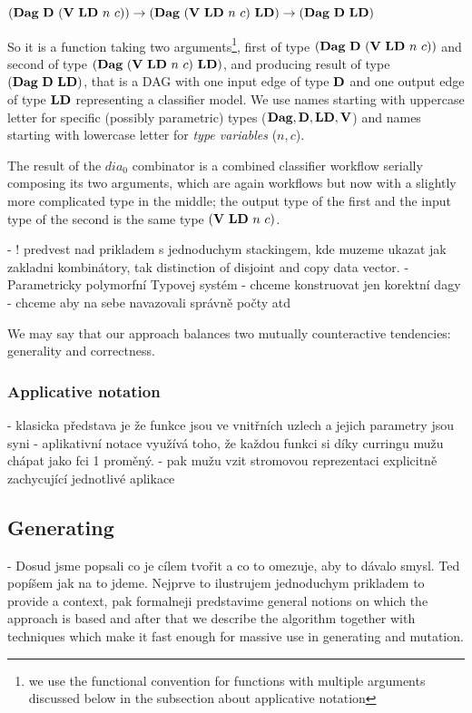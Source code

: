 \documentclass[a4paper,oneside]{memoir}
\begin{document}
$(\textbf{Dag}\ \textbf{D}\ (\textbf{V}\ \textbf{LD}\ n\ c)) \rightarrow (\textbf{Dag}\ (\textbf{V}\ \textbf{LD}\ n\ c)\ \textbf{LD}) \rightarrow (\textbf{Dag}\ \textbf{D}\ \textbf{LD})$
  
So it is a function taking two arguments\footnote{we use the functional convention for functions with multiple arguments discussed below in the subsection about applicative notation}, 
first of type $(\textbf{Dag}\ \textbf{D}\ (\textbf{V}\ \textbf{LD}\ n\ c))$ and second of type $(\textbf{Dag}\ (\textbf{V}\ \textbf{LD}\ n\ c)\ \textbf{LD})$, 
and producing result of type $(\textbf{Dag}\ \textbf{D}\ \textbf{LD})$, that is a DAG with one input edge of type $\textbf{D}$ and one output edge of type $\textbf{LD}$ representing a classifier model.
We use names starting with uppercase letter for specific (possibly parametric) types ($\textbf{Dag}, \textbf{D}, \textbf{LD}, \textbf{V}$) 
and names starting with lowercase letter for \textit{type variables} ($n, c$).

The result of the $dia_0$ combinator is a combined classifier workflow serially composing its two arguments, 
which are again workflows but now with a slightly more complicated type in the middle; 
the output type of the first and the input type of the second is the same type $(\textbf{V}\ \textbf{LD}\ n\ c)$. 

- ! predvest nad prikladem s jednoduchym stackingem, kde muzeme ukazat jak zakladni kombinátory, tak distinction of disjoint and copy data vector.
- Parametricky polymorfní Typovej systém
- chceme konstruovat jen korektní dagy
- chceme aby na sebe navazovali správně počty atd

We may say that our approach balances two mutually counteractive tendencies: generality and correctness.


\subsubsection{Applicative notation}

- klasicka představa je že funkce jsou ve vnitřních uzlech a jejich parametry jsou syni
- aplikativní notace využívá toho, že každou funkci si díky curringu mužu chápat jako fci 1 proměný. 
- pak mužu vzit stromovou reprezentaci explicitně zachycující jednotlivé aplikace

\subsection{Generating}

- Dosud jsme popsali co je cílem tvořit a co to omezuje, aby to dávalo smysl. Ted popíšem jak na to jdeme. Nejprve to ilustrujem jednoduchym prikladem to provide a context, pak formalneji predstavime general notions on which the approach is based and after that we describe the algorithm together with techniques which make it fast enough for massive use in generating and mutation.
\end{document}
